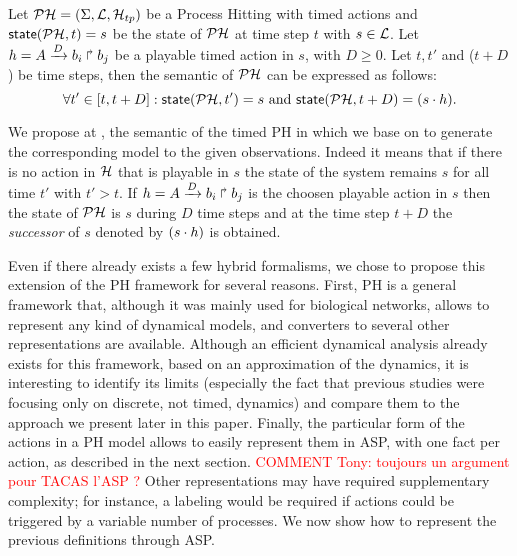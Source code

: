 \begin{definition}
\label{def:semantic}
Let $\mathcal{PH} = (\Sigma,\mathcal{L},\mathcal{H}_{tp})$ be a Process Hitting with timed actions and $\textsf{state}(\mathcal{PH}, t)=s$ be the state of $\mathcal{PH}$ at time step $t$ with $s \in \mathcal{L}$. Let $h = A\xrightarrow{D} b_i \Rsh b_j$ be a playable timed action in $s$, with $D \geq 0 $.
Let $t, t'$ and ($t+D$) be time steps, then the semantic of $\mathcal{PH}$ can be expressed as follows:
$$ \forall t' \in [t, t+D ] : \textsf{state}(\mathcal{PH}, t')=s \text{ and } \textsf{state}(\mathcal{PH}, t+D)=(s \cdot h).$$
\end{definition}

We propose at , the semantic of the timed PH in which we base on to generate the corresponding model to the given observations. Indeed it means that if there is no action in $\mathcal{H}$ that is playable in $s$ the state of the system remains $s$ for all time $t'$ with $t' > t$.%
If $h = A\xrightarrow{D} b_i \Rsh b_j$ is the choosen playable action in $s$ then the state of $\mathcal{PH}$ is $s$ during $D$ time steps and at the time step $t+D$
the \emph{successor} of $s$ denoted by $(s \cdot h)$ is obtained.

Even if there already exists a few hybrid formalisms, we chose to propose this extension of the PH framework for several reasons.
First, PH is a general framework that,
although it was mainly used for biological networks,
allows to represent any kind of dynamical models,
and converters to several other representations are available. %
Although an efficient dynamical analysis already exists for this framework,
based on an approximation of the dynamics,
it is interesting to identify its limits (especially the fact that previous studies were focusing only on discrete, not timed, dynamics)
and compare them to the approach we present later in this paper.
Finally, the particular form of the actions in a  PH model allows
to easily represent them in ASP,
with one fact per action, as described in the next section.
\textcolor{red}{COMMENT Tony: toujours un argument pour TACAS l'ASP ?}
Other representations may have required supplementary complexity;
for instance, a labeling would be required
if actions could be triggered by a variable number of processes.
We now show how to represent the previous definitions through ASP.

